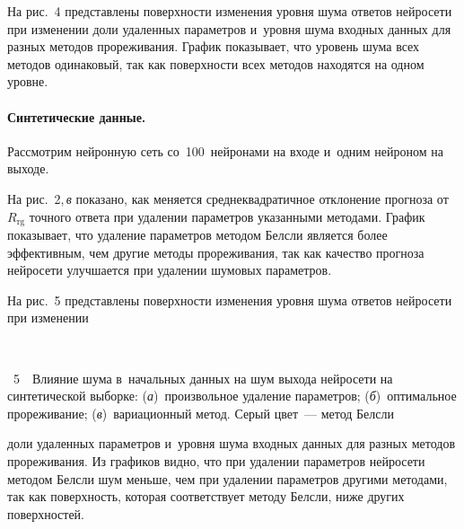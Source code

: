 \begin{multicols}{2}


На рис.~4 представлены поверхности изменения уровня шума ответов 
нейросети при изменении доли удаленных параметров и~уровня шума входных 
данных для разных методов прореживания. График показывает, что уровень шума всех 
методов одинаковый, так как поверхности всех методов находятся на одном уровне.

\vspace*{-9pt}

\paragraph*{Синтетические данные.} Рассмотрим нейронную сеть со~100~нейронами на 
входе и~одним нейроном на выходе.



На рис.~2,\,\textit{в} показано, как меняется сред\-не\-квад\-ра\-тич\-ное отклонение 
прогноза от $R_{\mathrm{rg}}$ точного ответа при удалении параметров указанными 
методами. График показывает, что удаление параметров
методом Белсли является 
более эффективным, чем другие методы прореживания, так как качество прогноза 
нейросети улучшается при удалении шумовых параметров.

На рис.~5 представлены поверхности изменения уровня шума ответов 
нейросети при изменении\linebreak\vspace*{-12pt}

{ \begin{center}  %
 \vspace*{-6pt}
  \mbox{%
 \epsfxsize=79mm 
 }


\end{center}


\noindent
{{\figurename~5}\ \ \small{Влияние шума в~начальных данных на шум выхода нейросети на 
синтетической выборке: (\textit{а})~произвольное удаление па\-ра\-мет\-ров; 
(\textit{б})~оптимальное 
прореживание; (\textit{в})~вариационный метод.
Серый цвет~--- метод Белсли}}
}

\vspace*{9pt}

\addtocounter{figure}{1}


\noindent
 доли удаленных параметров и~уровня шума входных 
данных для разных методов прореживания.\linebreak
 Из графиков видно, что при удалении 
параметров нейросети методом Белсли шум меньше, чем при удалении параметров 
другими методами, так как поверхность, которая соответствует методу Белсли, ниже 
других поверхностей.


\end{multicols}
